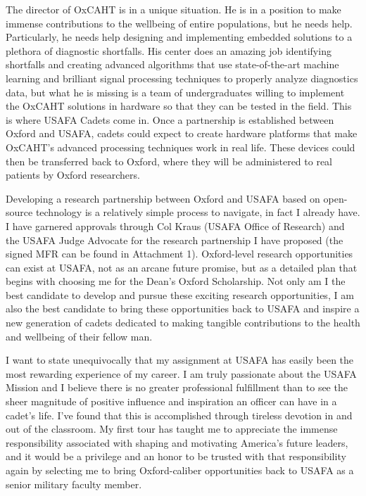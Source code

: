 \documentclass{article}
\begin{document}
The director of OxCAHT is in a unique situation. He is in a position to make
immense contributions to the wellbeing of entire populations, but he needs
help. Particularly, he needs help designing and implementing embedded solutions
to a plethora of diagnostic shortfalls. His center does an amazing job
identifying shortfalls and creating advanced algorithms that use
state-of-the-art machine learning and brilliant signal processing techniques to
properly analyze diagnostics data, but what he is missing is a team of
undergraduates willing to implement the OxCAHT solutions in hardware so that
they can be tested in the field. This is where USAFA Cadets come in. Once a
partnership is established between Oxford and USAFA, cadets could expect to
create hardware platforms that make OxCAHT's advanced processing techniques
work in real life. These devices could then be transferred back to Oxford,
where they will be administered to real patients by Oxford researchers.

Developing a research partnership between Oxford and USAFA based on open-source
technology is a relatively simple process to navigate, in fact I already have.
I have garnered approvals through Col Kraus (USAFA Office of Research) and the
USAFA Judge Advocate for the research partnership I have proposed (the signed
MFR can be found in Attachment 1). Oxford-level research opportunities can
exist at USAFA, not as an arcane future promise, but as a detailed plan that
begins with choosing me for the Dean's Oxford Scholarship. Not only am I the
best candidate to develop and pursue these exciting research opportunities, I
am also the best candidate to bring these opportunities back to USAFA and
inspire a new generation of cadets dedicated to making tangible contributions
to the health and wellbeing of their fellow man.
 
I want to state unequivocally that my assignment at USAFA has easily been the
most rewarding experience of my career. I am truly passionate about the USAFA
Mission and I believe there is no greater professional fulfillment than to see
the sheer magnitude of positive influence and inspiration an officer can have
in a cadet's life. I've found that this is accomplished through tireless
devotion in and out of the classroom. My first tour has taught me to appreciate
the immense responsibility associated with shaping and motivating America's
future leaders, and it would be a privilege and an honor to be trusted with
that responsibility again by selecting me to bring Oxford-caliber opportunities
back to USAFA as a senior military faculty member.
 
\end{document}
